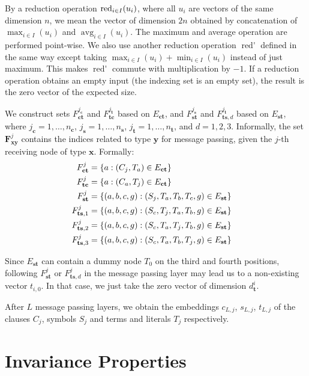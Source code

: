 \documentclass{ecai}
\newcommand{\red}{\mathop{\mathrm{red}}\limits}
\newcommand{\redd}{\mathop{\mathrm{red'}}\limits}
\DeclareMathOperator{\avg}{avg}
\newcommand{\nbc}[3]{
                {\colorbox{#3}{\bfseries\sffamily\scriptsize\textcolor{white}{#1}}}
                {\textcolor{#3}{\sffamily\small$\blacktriangleright$\textit{#2}$\blacktriangleleft$}}
}
\newcommand{\todoat}[2]{\nbc{TODO: #1}{#2}{todocolor}}
\begin{document}
By a reduction
operation $\red\nolimits_{i\in I}(u_i)$, where all $u_i$ are vectors of
the same dimension $n$, we mean the vector of dimension $2n$ obtained
by concatenation of $\max_{i\in I}(u_i)$ and $\avg_{i\in I}(u_i)$. The
maximum and average operation are performed point-wise. We also
use another reduction operation $\redd$ defined in the same way except
taking $\max_{i\in I}(u_i)+\min_{i\in I}(u_i)$ instead of just
maximum. This makes $\redd$ commute with multiplication by $-1$.
If a reduction operation obtains an empty input (the indexing set is
an empty set), the result is the zero vector of the expected size.

We construct sets $F^{j_{\mathbf c}}_{\mathbf{ct}}$ and $F^{j_{\mathbf t}}_{\mathbf{tc}}$
based on $E_{\mathbf{ct}}$, and
$F^{j_{\mathbf s}}_{\mathbf{st}}$ and
$F^{j_{\mathbf t}}_{\mathbf{ts},d}$ based on $E_{\mathbf{st}}$, where
$j_{\mathbf c}=1,\ldots,{n_{\mathbf c}}$, $j_{\mathbf s}=1,\ldots,{n_{\mathbf s}}$,
$j_{\mathbf t}=1,\ldots,{n_{\mathbf t}}$, and $d=1,2,3$. 
Informally, the set $\mathbf F^j_{\mathbf {xy}}$ contains the indices related to type $\mathbf y$ for message passing, given the $j$-th receiving node of type $\mathbf x$.
Formally:
\begin{align*}
F^{j}_{\mathbf{ct}} &= \{a : (C_j, T_a)\in E_{\mathbf{ct}}\}\cr
F^{j}_{\mathbf{tc}} &= \{a : (C_a, T_j)\in E_{\mathbf{ct}}\}\cr
F^{j}_{\mathbf{st}} &= \{(a,b,c,g) : (S_j, T_a, T_b, T_c, g)\in E_{\mathbf{st}}\}\cr
F^{j}_{\mathbf{ts},1} &= \{(a,b,c,g) : (S_c, T_j, T_a, T_b, g)\in E_{\mathbf{st}}\}\cr
F^{j}_{\mathbf{ts},2} &= \{(a,b,c,g) : (S_c, T_a, T_j, T_b, g)\in E_{\mathbf{st}}\}\cr
F^{j}_{\mathbf{ts},3} &= \{(a,b,c,g) : (S_c, T_a, T_b, T_j, g)\in E_{\mathbf{st}}\}\cr
\end{align*}

Since $E_{\mathbf{st}}$ can contain a dummy node $T_0$ on the third and fourth positions, following $F^{j}_{\mathbf{st}}$ or $F^{j}_{\mathbf{ts},d}$ in the message passing layer may lead us to a non-existing vector $t_{i,0}$. In that case, we just take the zero vector of dimension $d^i_{\mathbf t}$.

After $L$ message passing layers, we obtain the embeddings $c_{L,j}$, $s_{L,j}$, $t_{L,j}$ of the clauses $C_j$, symbols $S_j$ and terms and literals $T_j$ respectively.

\section{Invariance Properties}
\label{invariance}
\end{document}
